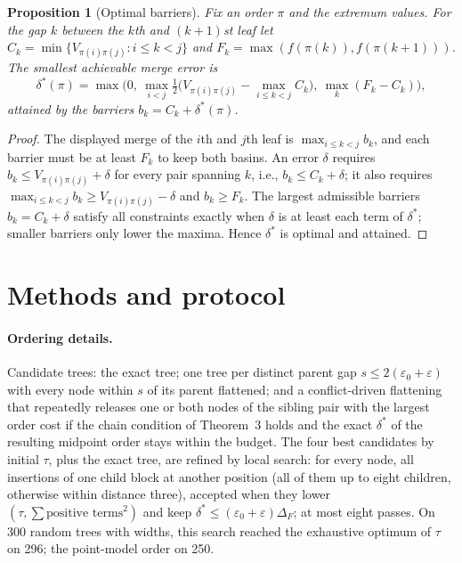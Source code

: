 \documentclass[10pt]{article}
\newtheorem{proposition}{Proposition}
\begin{document}
\begin{proposition}[Optimal barriers]
Fix an order $\pi$ and the extremum values. For the gap $k$ between the $k$th and $(k{+}1)$st leaf let $C_k=\min\{V_{\pi(i)\pi(j)}: i\le k<j\}$ and $F_k=\max(f(\pi(k)),f(\pi(k{+}1)))$. The smallest achievable merge error is
\[
\delta^*(\pi)=\max\Big(0,\ \max_{i<j}\tfrac12\big(V_{\pi(i)\pi(j)}-\max_{i\le k<j}C_k\big),\ \max_k(F_k-C_k)\Big),
\]
attained by the barriers $b_k=C_k+\delta^*(\pi)$.
\end{proposition}
\begin{proof}
The displayed merge of the $i$th and $j$th leaf is $\max_{i\le k<j}b_k$, and each barrier must be at least $F_k$ to keep both basins. An error $\delta$ requires $b_k\le V_{\pi(i)\pi(j)}+\delta$ for every pair spanning $k$, i.e., $b_k\le C_k+\delta$; it also requires $\max_{i\le k<j}b_k\ge V_{\pi(i)\pi(j)}-\delta$ and $b_k\ge F_k$. The largest admissible barriers $b_k=C_k+\delta$ satisfy all constraints exactly when $\delta$ is at least each term of $\delta^*$; smaller barriers only lower the maxima. Hence $\delta^*$ is optimal and attained.
\end{proof}

\section{Methods and protocol}
\paragraph{Ordering details.} Candidate trees: the exact tree; one tree per distinct parent gap $s\le2(\varepsilon_0+\varepsilon)$ with every node within $s$ of its parent flattened; and a conflict-driven flattening that repeatedly releases one or both nodes of the sibling pair with the largest order cost if the chain condition of Theorem~3 holds and the exact $\delta^*$ of the resulting midpoint order stays within the budget. The four best candidates by initial $\tau$, plus the exact tree, are refined by local search: for every node, all insertions of one child block at another position (all of them up to eight children, otherwise within distance three), accepted when they lower $(\tau,\sum\text{positive terms}^2)$ and keep $\delta^*\le(\varepsilon_0+\varepsilon)\Delta_F$; at most eight passes. On 300 random trees with widths, this search reached the exhaustive optimum of $\tau$ on 296; the point-model order on 250.
\end{document}
